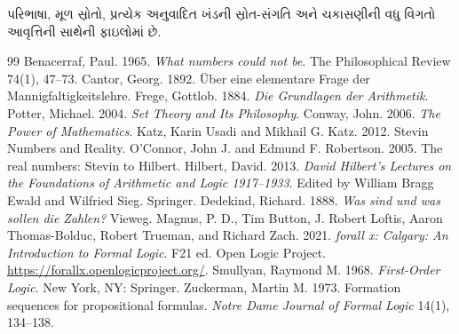 પરિભાષા, મૂળ સ્રોતો, પ્રત્યેક અનુવાદિત ખંડની સ્રોત-સંગતિ અને
ચકાસણીની વધુ વિગતો આવૃત્તિની સાથેની ફાઇલોમાં છે.
\begin{thebibliography}{99}
Benacerraf, Paul. 1965. \emph{What numbers could not be}.
The Philosophical Review 74(1), 47--73.
Cantor, Georg. 1892. Über eine elementare Frage der Mannigfaltigkeitslehre.
Frege, Gottlob. 1884. \emph{Die Grundlagen der Arithmetik}.
Potter, Michael. 2004. \emph{Set Theory and Its Philosophy}.
Conway, John. 2006. \emph{The Power of Mathematics}.
Katz, Karin Usadi and Mikhail G. Katz. 2012. Stevin Numbers and Reality.
O'Connor, John J. and Edmund F. Robertson. 2005. The real numbers: Stevin to Hilbert.
Hilbert, David. 2013. \emph{David Hilbert's Lectures on the Foundations of Arithmetic and Logic 1917--1933}.
Edited by William Bragg Ewald and Wilfried Sieg. Springer.
Dedekind, Richard. 1888. \emph{Was sind und was sollen die Zahlen?} Vieweg.
Magnus, P. D., Tim Button, J. Robert Loftis, Aaron Thomas-Bolduc,
Robert Trueman, and Richard Zach. 2021. \emph{forall x: Calgary: An
Introduction to Formal Logic}. F21 ed. Open Logic Project.
\url{https://forallx.openlogicproject.org/}.
\ifdefined\guincludesyntaxbibliography
{}
Smullyan, Raymond M. 1968. \emph{First-Order Logic}.
New York, NY: Springer.
Zuckerman, Martin M. 1973. Formation sequences for propositional formulas.
\emph{Notre Dame Journal of Formal Logic} 14(1), 134--138.
\fi
\end{thebibliography}

